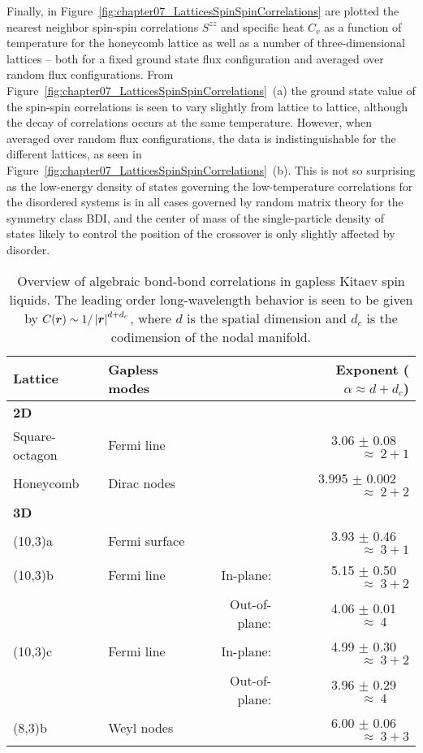 Finally, in Figure~\ref{fig:chapter07_LatticesSpinSpinCorrelations} are plotted the nearest neighbor spin-spin correlations $S^{zz}$ and specific heat $C_v$ as a function of temperature for the honeycomb lattice as well as a number of three-dimensional lattices -- both for a fixed ground state flux configuration and averaged over random flux configurations.
From Figure~\ref{fig:chapter07_LatticesSpinSpinCorrelations}~(a) the ground state value of the spin-spin correlations is seen to vary slightly from lattice to lattice, although the decay of correlations occurs at the same temperature.
However, when averaged over random flux configurations, the data is indistinguishable for the different lattices, as seen in Figure~\ref{fig:chapter07_LatticesSpinSpinCorrelations}~(b).
This is not so surprising as the low-energy density of states governing the low-temperature correlations for the disordered systems is in all cases governed by random matrix theory for the symmetry class BDI, and the center of mass of the single-particle density of states likely to control the position of the crossover is only slightly affected by disorder.
%
\begin{table}[tb]
	\centering
	\resizebox{\textwidth}{!}
	{\begin{tabular}{llrr}
		\hline
		\textbf{Lattice}             & \textbf{Gapless modes}	&	& \textbf{Exponent ($\alpha \approx d + d_c$)}     	\\ \hline
		\textbf{2D}                  & 							&	&							\\
		Square-octagon				 & Fermi line 				&	& 3.06 $\pm$ 0.08~~ 			$\approx~ 2 + 1$ \\
		Honeycomb					 & Dirac nodes        		&	& 3.995 $\pm$ 0.002~~ 		$\approx~ 2 + 2$ \\
		\textbf{3D}                  & 							&	&							\\
		(10,3)a 					 & Fermi surface     		&	& 3.93 $\pm$ 0.46~~ 			$\approx~ 3 + 1$ \\
		(10,3)b						 & Fermi line        		& In-plane:		& 5.15 $\pm$ 0.50~~	 $\approx~ 3 + 2$		\\
		& 							& Out-of-plane:	& 4.06 $\pm$ 0.01~~ 	 $\approx~ 4\;\,\phantom{+ 1}$			\\
		(10,3)c						 & Fermi line        		& In-plane: 	& 4.99 $\pm$ 0.30~~	 $\approx~ 3 + 2$		\\
		& 							& Out-of-plane:	& 3.96 $\pm$ 0.29~~	 $\approx~ 4\;\, \phantom{+ 1}$	 		\\
		(8,3)b 						 & Weyl nodes        		&	& 6.00 $\pm$ 0.06~~	 $\approx~ 3 + 3$ 		\\
	\end{tabular}}
	\caption{
		Overview of algebraic bond-bond correlations in gapless Kitaev spin liquids.
		The leading order long-wavelength behavior is seen to be given by $C(\bm{r}) \sim 1/\left| \bm{r} \right|^{d + d_c}$, where $d$ is the spatial dimension and $d_c$ is the codimension of the nodal manifold.
	}
	\label{table:chapter07_BondBondCorrelations}
\end{table}
%
\newpage


